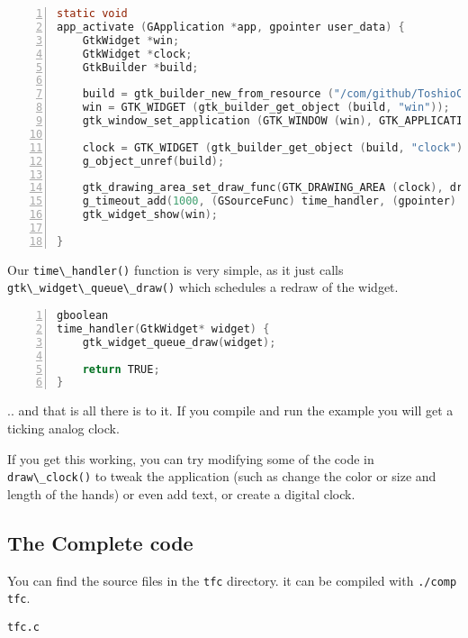 \begin{lstlisting}[language=C, numbers=left]
static void
app_activate (GApplication *app, gpointer user_data) {
    GtkWidget *win;
    GtkWidget *clock;
    GtkBuilder *build;

    build = gtk_builder_new_from_resource ("/com/github/ToshioCP/tfc/tfc.ui");
    win = GTK_WIDGET (gtk_builder_get_object (build, "win"));
    gtk_window_set_application (GTK_WINDOW (win), GTK_APPLICATION (app));

    clock = GTK_WIDGET (gtk_builder_get_object (build, "clock"));
    g_object_unref(build);

    gtk_drawing_area_set_draw_func(GTK_DRAWING_AREA (clock), draw_clock, NULL, NULL);
    g_timeout_add(1000, (GSourceFunc) time_handler, (gpointer) clock);
    gtk_widget_show(win);

}
\end{lstlisting}

Our \passthrough{\lstinline!time\_handler()!} function is very simple,
as it just calls \passthrough{\lstinline!gtk\_widget\_queue\_draw()!}
which schedules a redraw of the widget.

\begin{lstlisting}[language=C, numbers=left]
gboolean
time_handler(GtkWidget* widget) {
    gtk_widget_queue_draw(widget);

    return TRUE;
}
\end{lstlisting}

.. and that is all there is to it. If you compile and run the example
you will get a ticking analog clock.

If you get this working, you can try modifying some of the code in
\passthrough{\lstinline!draw\_clock()!} to tweak the application (such
as change the color or size and length of the hands) or even add text,
or create a digital clock.

\hypertarget{the-complete-code}{%
\subsection{The Complete code}\label{the-complete-code}}

You can find the source files in the \passthrough{\lstinline!tfc!}
directory. it can be compiled with \passthrough{\lstinline!./comp tfc!}.

\passthrough{\lstinline!tfc.c!}

